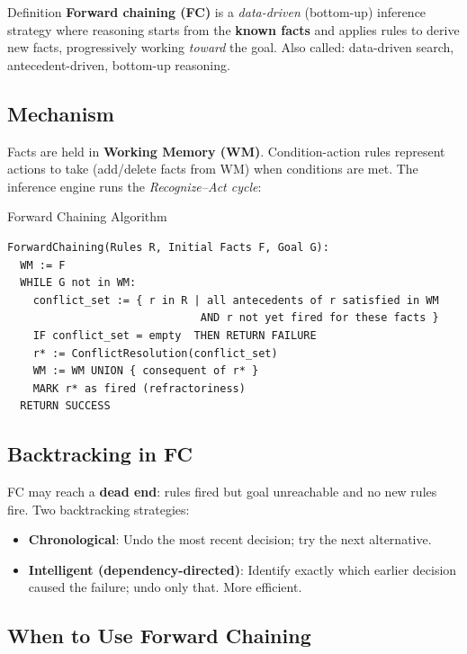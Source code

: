 \documentclass[12pt,a4paper]{article}
\begin{document}
\begin{defbox}{Definition}
\textbf{Forward chaining (FC)} is a \emph{data-driven} (bottom-up) inference strategy
where reasoning starts from the \textbf{known facts} and applies rules to derive new facts,
progressively working \emph{toward} the goal.
Also called: data-driven search, antecedent-driven, bottom-up reasoning.
\end{defbox}

\subsection{Mechanism}

Facts are held in \textbf{Working Memory (WM)}.
Condition-action rules represent actions to take (add/delete facts from WM) when conditions are met.
The inference engine runs the \emph{Recognize--Act cycle}:

\begin{algobox}{Forward Chaining Algorithm}
\begin{verbatim}
ForwardChaining(Rules R, Initial Facts F, Goal G):
  WM := F
  WHILE G not in WM:
    conflict_set := { r in R | all antecedents of r satisfied in WM
                              AND r not yet fired for these facts }
    IF conflict_set = empty  THEN RETURN FAILURE
    r* := ConflictResolution(conflict_set)
    WM := WM UNION { consequent of r* }
    MARK r* as fired (refractoriness)
  RETURN SUCCESS
\end{verbatim}
\end{algobox}

\subsection{Backtracking in FC}

FC may reach a \textbf{dead end}: rules fired but goal unreachable and no new rules fire.
Two backtracking strategies:
\begin{itemize}
  \item \textbf{Chronological}: Undo the most recent decision; try the next alternative.
  \item \textbf{Intelligent (dependency-directed)}: Identify exactly which earlier decision
        caused the failure; undo only that. More efficient.
\end{itemize}

\subsection{When to Use Forward Chaining}
\end{document}
